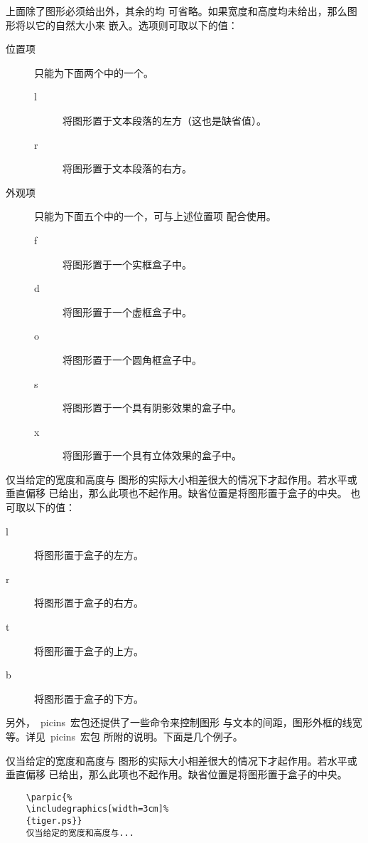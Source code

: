 \noindent 上面除了{图形}必须给出外，其余的均
可省略。如果宽度和高度均未给出，那么图形将以它的自然大小来
嵌入。{选项}则可取以下的值：
\begin{description}
	\item [ 位置项] 只能为下面两个中的一个。
	\begin{description}
		\item [l] 将图形置于文本段落的左方（这也是缺省值）。
		\item [r] 将图形置于文本段落的右方。
	\end{description}
	\item [ 外观项] 只能为下面五个中的一个，可与上述位置项
	配合使用。
	\begin{description}
		\item [f] 将图形置于一个实框盒子中。
		\item [d] 将图形置于一个虚框盒子中。
		\item [o] 将图形置于一个圆角框盒子中。
		\item [s] 将图形置于一个具有阴影效果的盒子中。
		\item [x] 将图形置于一个具有立体效果的盒子中。
	\end{description}
\end{description}

仅当给定的宽度和高度与
图形的实际大小相差很大的情况下才起作用。若水平或垂直偏移
已给出，那么此项也不起作用。缺省位置是将图形置于盒子的中央。
也可取以下的值：
\begin{description}
	\item [l] 将图形置于盒子的左方。
	\item [r] 将图形置于盒子的右方。
	\item [t] 将图形置于盒子的上方。
	\item [b] 将图形置于盒子的下方。
\end{description}

另外，~\textsf{picins}~宏包还提供了一些命令来控制图形
与文本的间距，图形外框的线宽等。详见~\textsf{picins}~宏包
所附的说明。下面是几个例子。

\hspace{-1.5cm}\begin{minipage}[b]{.5\textwidth}
	仅当给定的宽度和高度与
	图形的实际大小相差很大的情况下才起作用。若水平或垂直偏移
	已给出，那么此项也不起作用。缺省位置是将图形置于盒子的中央。
	\par\vspace{0pt}
\end{minipage}%
\hspace{10pt}\begin{minipage}[b]{.5\textwidth}
	\begin{Verbatim}
	\parpic{%
	\includegraphics[width=3cm]%
	{tiger.ps}}
	仅当给定的宽度和高度与...
	\end{Verbatim}
	\par\vspace{0pt}
\end{minipage}

